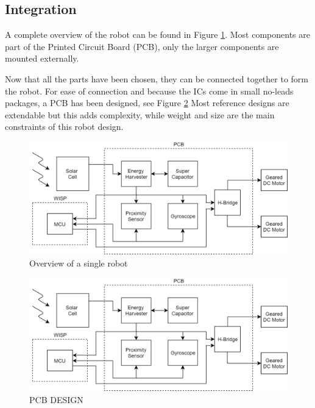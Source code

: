 \subsection{Integration}

A complete overview of the robot can be found in Figure \ref{fig:robot_overview}.
Most components are part of the Printed Circuit Board (PCB), only the larger components are mounted externally.


Now that all the parts have been chosen, they can be connected together to form the robot.
For ease of connection and because the ICs come in small no-leads packages, a PCB has been designed, see Figure \ref{fig:pcb_robot}
Most reference designs are extendable but this adds complexity, while weight and size are the main constraints of this robot design.



\begin{figure}
	\centering
	\includegraphics[width=\textwidth]{pics/schematic_robot_v2.png}
	\caption{Overview of a single robot}
	\label{fig:robot_overview}
\end{figure}


\begin{figure}
	\centering
	\includegraphics[width=\textwidth]{pics/schematic_robot_v2.png}
	\caption{PCB DESIGN}
	\label{fig:pcb_robot}
\end{figure}


